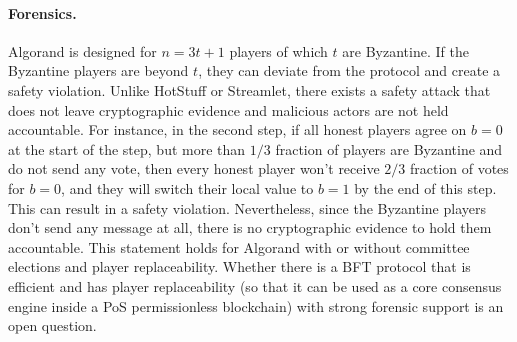 \documentclass{article}
\newcommand{\bba}{\ensuremath{BBA^*}\xspace}
\begin{document}
\paragraph{Forensics.} Algorand is designed for $n=3t+1$ players of which $t$ are Byzantine. If the Byzantine players are beyond $t$, they can deviate from the protocol and create a safety violation. Unlike HotStuff or Streamlet, there exists a safety attack that does not leave cryptographic evidence and malicious actors are not held accountable. For instance, in the second step, if all honest players agree on $b=0$ at the start of the step, but more than $1/3$ fraction of players are Byzantine and do not send any vote, then every honest player won't receive $2/3$ fraction of votes for $b = 0$, and they will switch their local value to $b = 1$ by the end of this step. This can result in a safety violation. Nevertheless, since the Byzantine players don't send any message at all, there is no cryptographic evidence to hold them accountable. This statement holds for Algorand with or without committee elections and player replaceability. Whether there is a BFT protocol that is efficient and has player replaceability (so that it can be used as a core consensus engine inside a PoS permissionless blockchain) with strong forensic support is an open question. 


\end{document}
